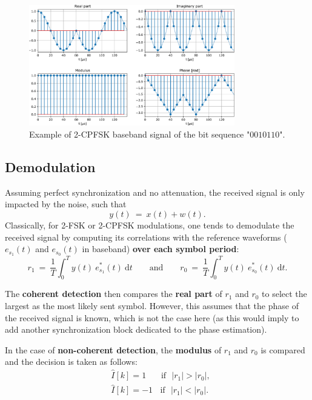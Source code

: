 \begin{figure}[h]
    \centering
    \includegraphics[width=0.8\textwidth]{figures/2-cpfsk-bis.pdf}
    \caption{Example of 2-CPFSK baseband signal of the bit sequence "$0010110$".}
    \label{fig:2CPFSKbaseband}
\end{figure}


\subsection{Demodulation}
Assuming perfect synchronization and no attenuation, the received signal is only impacted by the noise, such that
\begin{equation*}
    y(t)\:=\:x(t) + w(t).
\end{equation*}
Classically, for 2-FSK or 2-CPFSK modulations, one tends to demodulate the received signal by computing its correlations with the reference waveforms ($e_{s_1}(t)$ and $e_{s_0}(t)$ in baseband) \textbf{over each symbol period}:
\begin{equation*}
    r_1\:=\:\frac{1}{T}\int_0^T y(t)\:e_{s_1}^*(t) \:\text{d}t\qquad \text{and} \qquad r_0\:=\:\frac{1}{T}\int_0^T y(t)\:e_{s_0}^*(t) \:\text{d}t.
\end{equation*}

The \textbf{coherent detection} then compares the \textbf{real part} of $r_1$ and $r_0$ to select the largest as the most likely sent symbol. However, this assumes that the phase of the received signal is known, which is not the case here (as this would imply to add another synchronization block dedicated to the phase estimation).

In the case of \textbf{non-coherent detection}, the \textbf{modulus} of $r_1$ and $r_0$ is compared and the decision is taken as follows:
\begin{align*}
    &\hat{I}[k]=1 \: \:\:\:\:\:\:\:\text{if}\:\:\: |r_1| > |r_0|,\\
    &\hat{I}[k]=-1 \:\: \:\:\text{if}\:\:\: |r_1| < |r_0|.
\end{align*}

